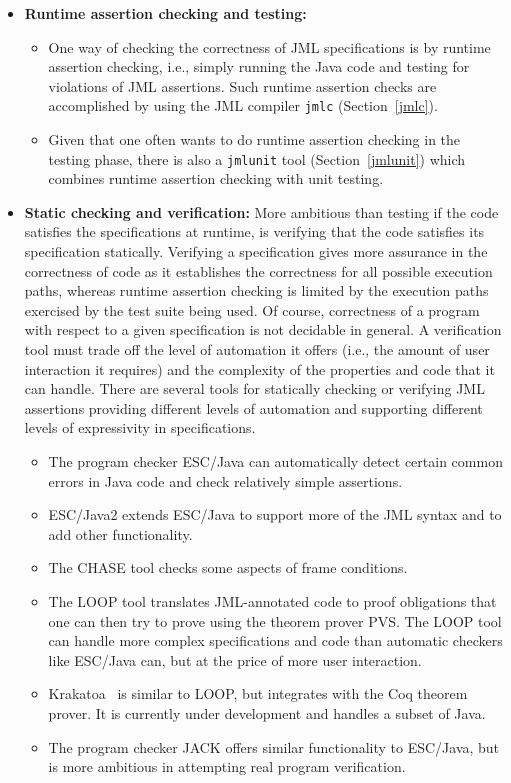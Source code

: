 \begin{itemize}
\item {\bf Runtime assertion checking and testing:}
\begin{itemize}
\item One way of checking the correctness of JML specifications is by
  runtime assertion checking, i.e., simply running the Java code and
  testing for violations of JML assertions.  Such runtime assertion
  checks are accomplished by using the JML compiler {\tt jmlc}
  (Section~\ref{jmlc}).
\item Given that one often wants to do runtime assertion checking in
  the testing phase, there is also a {\tt jmlunit} tool
  (Section~\ref{jmlunit}) which combines runtime assertion checking
  with unit testing.
\end{itemize}
\item {\bf Static checking and verification:} More ambitious than
  testing if the code satisfies the specifications at runtime, is
  verifying that the code satisfies its specification statically.
  Verifying a specification gives more assurance in the correctness of
  code as it establishes the correctness for all possible execution paths,
  whereas runtime assertion checking is limited by the execution paths
  exercised by the test suite being used.  Of course, correctness of a
  program with respect to a given specification is not decidable in
  general.  A verification tool must trade off the level of automation
  it offers (i.e., the amount of user interaction it requires) and the
  complexity of the properties and code that it can handle.  There are
  several tools for statically checking or verifying JML assertions
  providing different levels of automation and supporting different
  levels of expressivity in specifications.
\begin{itemize}
\item The program checker ESC/Java  can
  automatically detect certain common errors in Java code and check
  relatively simple assertions.
\item ESC/Java2 extends ESC/Java
  to support more of the JML syntax and to add other functionality.
\item The CHASE tool checks some aspects of
  frame conditions.
\item The LOOP tool translates JML-annotated code
  to proof obligations that one can then try to prove using the
  theorem prover PVS\@.  The LOOP tool can handle more complex
  specifications and code than automatic checkers like ESC/Java can,
  but at the price of more user interaction.
\item Krakatoa~\cite{krakatoa03a} is similar to LOOP, but integrates
  with the Coq theorem prover.  It is currently under development and
  handles a subset of Java.
\item The program checker JACK offers similar
  functionality to ESC/Java, but is more ambitious in attempting real
  program verification.
\end{itemize}


\end{itemize}
